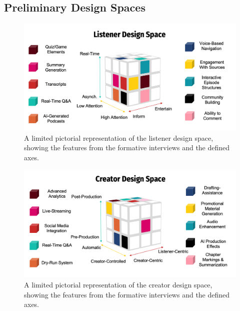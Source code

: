 \documentclass[12pt]{report}
\begin{document}
\begin{myfont}
        \chapter{Preliminary Design Spaces}
        \label{app:D}
            \begin{figure}[H]
                \centering
                \includegraphics[width=1\textwidth]{figures/Listener_DS.png}
                \caption{A limited pictorial representation of the listener design space, showing the features from the formative interviews and the defined axes.}
                \label{fig:listenerds}
            \end{figure}

            \begin{figure}[H]
                \centering
                \includegraphics[width=1\textwidth]{figures/Creator_DS.png}
                \caption{A limited pictorial representation of the creator design space, showing the features from the formative interviews and the defined axes.}
                \label{fig:creatords}
            \end{figure}


\end{myfont}
\end{document}
